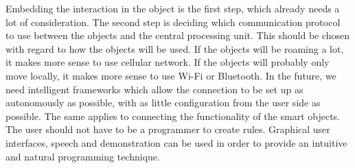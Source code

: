 Embedding the interaction in the object is the first step, which already needs a lot of consideration.
The second step is deciding which communication protocol to use between the objects and the central processing unit.
This should be chosen with regard to how the objects will be used. If the objects will be roaming a lot, it makes more sense to use cellular network.
If the objects will probably only move locally, it makes more sense to use Wi-Fi or Bluetooth. In the future, we need intelligent frameworks which allow the connection to be set up as autonomously as possible, with as little configuration from the user side as possible.
The same applies to connecting the functionality of the smart objects.
The user should not have to be a programmer to create rules.
Graphical user interfaces, speech and demonstration can be used in order to provide an intuitive and natural programming technique.





\balancecolumns

